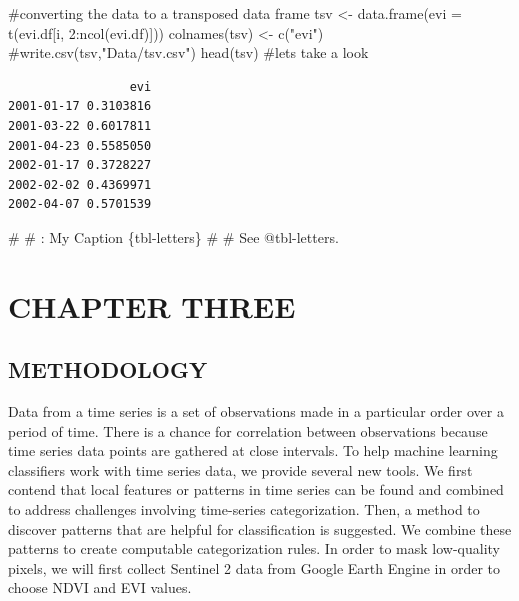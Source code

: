 \documentclass[
  letterpaper,
  DIV=11,
  numbers=noendperiod]{scrartcl}
\newenvironment{Shaded}{\begin{snugshade}}{\end{snugshade}}
\newcommand{\AttributeTok}[1]{\textcolor[rgb]{0.40,0.45,0.13}{#1}}
\newcommand{\CommentTok}[1]{\textcolor[rgb]{0.37,0.37,0.37}{#1}}
\newcommand{\DecValTok}[1]{\textcolor[rgb]{0.68,0.00,0.00}{#1}}
\newcommand{\FunctionTok}[1]{\textcolor[rgb]{0.28,0.35,0.67}{#1}}
\newcommand{\NormalTok}[1]{\textcolor[rgb]{0.00,0.23,0.31}{#1}}
\newcommand{\OtherTok}[1]{\textcolor[rgb]{0.00,0.23,0.31}{#1}}
\newcommand{\SpecialCharTok}[1]{\textcolor[rgb]{0.37,0.37,0.37}{#1}}
\newcommand{\StringTok}[1]{\textcolor[rgb]{0.13,0.47,0.30}{#1}}
\begin{document}
\begin{Shaded}
\begin{Highlighting}[]
\CommentTok{\#converting the data to a transposed data frame}
\NormalTok{tsv }\OtherTok{\textless{}{-}} \FunctionTok{data.frame}\NormalTok{(}\AttributeTok{evi =} \FunctionTok{t}\NormalTok{(evi.df[i, }\DecValTok{2}\SpecialCharTok{:}\FunctionTok{ncol}\NormalTok{(evi.df)])) }
\FunctionTok{colnames}\NormalTok{(tsv) }\OtherTok{\textless{}{-}} \FunctionTok{c}\NormalTok{(}\StringTok{"evi"}\NormalTok{)}
\CommentTok{\#write.csv(tsv,"Data/tsv.csv")}
\FunctionTok{head}\NormalTok{(tsv) }\CommentTok{\#let\textquotesingle{}s take a look}
\end{Highlighting}
\end{Shaded}

\begin{verbatim}
                 evi
2001-01-17 0.3103816
2001-03-22 0.6017811
2001-04-23 0.5585050
2002-01-17 0.3728227
2002-02-02 0.4369971
2002-04-07 0.5701539
\end{verbatim}

\begin{Shaded}
\begin{Highlighting}[]
\CommentTok{\# }
\CommentTok{\# : My Caption \{tbl{-}letters\}}
\CommentTok{\# }
\CommentTok{\# See @tbl{-}letters.}
\end{Highlighting}
\end{Shaded}

\hypertarget{chapter-three}{%
\section{CHAPTER THREE}\label{chapter-three}}

\hypertarget{methodology}{%
\subsection{METHODOLOGY}\label{methodology}}

Data from a time series is a set of observations made in a particular
order over a period of time. There is a chance for correlation between
observations because time series data points are gathered at close
intervals. To help machine learning classifiers work with time series
data, we provide several new tools. We first contend that local features
or patterns in time series can be found and combined to address
challenges involving time-series categorization. Then, a method to
discover patterns that are helpful for classification is suggested. We
combine these patterns to create computable categorization rules. In
order to mask low-quality pixels, we will first collect Sentinel 2 data
from Google Earth Engine in order to choose NDVI and EVI values.
\end{document}
